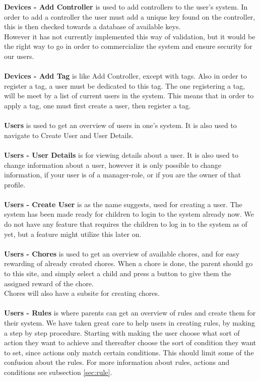 \textbf{Devices - Add Controller} is used to add controllers to the user's system. In order to add a controller the user must add a unique key found on the controller, this is then checked towards a database of available keys.\\
However it has not currently implemented this way of validation, but it would be the right way to go in order to commercialize the system and ensure security for our users.\\
\\
\textbf{Devices - Add Tag} is like Add Controller, except with tags. Also in order to register a tag, a user must be dedicated to this tag. The one registering a tag, will be meet by a list of current users in the system. This means that in order to apply a tag, one must first create a user, then register a tag.\\
\\
\textbf{Users} is used to get an overview of users in one's system. It is also used to navigate to Create User and User Details.\\
\\
\textbf{Users - User Details} is for viewing details about a user. It is also used to change information about a user, however it is only possible to change information, if your user is of a manager-role, or if you are the owner of that profile.\\
\\
\textbf{Users - Create User} is as the name suggests, used for creating a user. The system has been made ready for children to login to the system already now. We do not have any feature that requires the children to log in to the system as of yet, but a feature might utilize this later on.\\
\\
\textbf{Users - Chores} is used to get an overview of available chores, and for easy rewarding of already created chores. When a chore is done, the parent should go to this site, and simply select a child and press a button to give them the assigned reward of the chore.\\
Chores will also have a subsite for creating chores.\\
\\
\textbf{Users - Rules} is where parents can get an overview of rules and create them for their system. We have taken great care to help users in creating rules, by making a step by step procedure. Starting with making the user choose what sort of action they want to achieve and thereafter choose the sort of condition they want to set, since actions only match certain conditions. This should limit some of the confusion about the rules. For more information about rules, actions and conditions see subsection \vref{sec:rule}.\\
